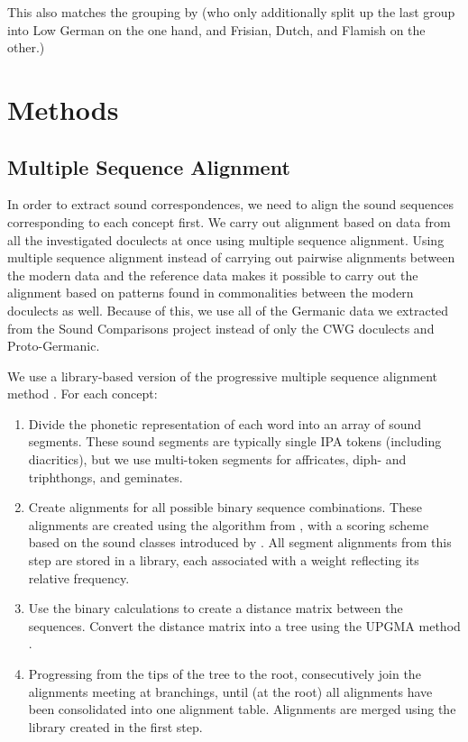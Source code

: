 \documentclass[a4paper]{article}
\begin{document}
This also matches the grouping by \citet{heggarty2018sound}
(who only additionally split up the last group into
Low German on the one hand,
and Frisian, Dutch, and Flamish on the other.)

\newpage
\section{Methods}
\label{sec:methods}

\subsection{Multiple Sequence Alignment}
\label{subsec:msa}

In order to extract sound correspondences, we need to align the sound sequences corresponding to each concept first.
We carry out alignment based on data from all the investigated doculects at once using multiple sequence alignment.
Using multiple sequence alignment instead of carrying out pairwise alignments between the modern data and the reference data makes it possible to carry out the alignment based on patterns found in commonalities between the modern doculects as well.
Because of this, we use all of the Germanic data we extracted from the Sound Comparisons project instead of only the CWG doculects and Proto-Germanic.

We use a library-based version \citep{notredame2000t-coffee:} of the progressive multiple sequence alignment method \citep{thompson1994clustal}.
For each concept:

\begin{enumerate}
\item
Divide the phonetic representation of each word into an array of sound segments.
These sound segments are typically single IPA tokens (including diacritics), but we use multi-token segments for affricates, diph- and triphthongs, and geminates.

\item
Create alignments for all possible binary sequence combinations.
These alignments are created using the algorithm from \citet{needleman1970general},
with a scoring scheme based on the sound classes introduced by \citet{list2012sca}.
All segment alignments from this step are stored in a library,
each associated with a weight reflecting its relative frequency.

\item
Use the binary calculations to create a distance matrix between the sequences.
Convert the distance matrix into a tree using the UPGMA method \citep{sokal1958statistical}.

\item 
Progressing from the tips of the tree to the root,
consecutively join the alignments meeting at branchings,
until (at the root) all alignments have been consolidated into one alignment table.
Alignments are merged using the library created in the first step.
\end{enumerate}
\end{document}
